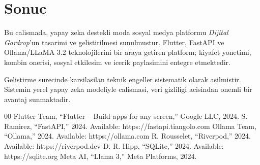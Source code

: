 \documentclass[conference]{IEEEtran}
\begin{document}
\section{Sonuc}

Bu calismada, yapay zeka destekli moda sosyal medya platformu \textit{Dijital Gardrop}'un tasarimi ve gelistirilmesi sunulmustur. Flutter, FastAPI ve Ollama/LLaMA 3.2 teknolojilerini bir araya getiren platform; kiyafet yonetimi, kombin onerisi, sosyal etkilesim ve icerik paylasimini entegre etmektedir.

Gelistirme surecinde karsilasilan teknik engeller sistematik olarak asilmistir. Sistemin yerel yapay zeka modeliyle calismasi, veri gizliligi acisindan onemli bir avantaj sunmaktadir.

\begin{thebibliography}{00}
 Flutter Team, ``Flutter -- Build apps for any screen,'' Google LLC, 2024.
 S. Ramirez, ``FastAPI,'' 2024. Available: https://fastapi.tiangolo.com
 Ollama Team, ``Ollama,'' 2024. Available: https://ollama.com
 R. Rousselet, ``Riverpod,'' 2024. Available: https://riverpod.dev
 D. R. Hipp, ``SQLite,'' 2024. Available: https://sqlite.org
 Meta AI, ``Llama 3,'' Meta Platforms, 2024.
\end{thebibliography}
\end{document}
